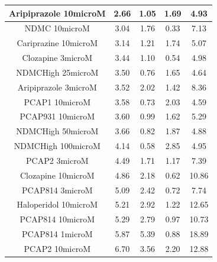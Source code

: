 \begin{table}[h!]
\begin{tabular}{|c|c|c|c|c|}
Aripiprazole 10microM & 2.66 & 1.05 & 1.69 & 4.93  \\ \hline
NDMC 10microM         & 3.04 & 1.76 & 0.33 & 7.13  \\ \hline
Cariprazine 10microM  & 3.14 & 1.21 & 1.74 & 5.07  \\ \hline
Clozapine 3microM     & 3.44 & 1.10  & 0.54 & 4.98  \\ \hline
NDMCHigh 25microM     & 3.50  & 0.76 & 1.65 & 4.64  \\ \hline
Aripiprazole 3microM  & 3.52 & 2.02 & 1.42 & 8.36  \\ \hline
PCAP1 10microM        & 3.58 & 0.73 & 2.03 & 4.59  \\ \hline
PCAP931 10microM      & 3.60  & 0.99 & 1.62 & 5.29  \\ \hline
NDMCHigh 50microM     & 3.66 & 0.82 & 1.87 & 4.88  \\ \hline
NDMCHigh 100microM    & 4.14 & 0.58 & 2.85 & 4.95  \\ \hline
PCAP2 3microM         & 4.49 & 1.71 & 1.17 & 7.39  \\ \hline
Clozapine 10microM    & 4.86 & 2.18 & 0.62 & 10.86 \\ \hline
PCAP814 3microM       & 5.09 & 2.42 & 0.72 & 7.74  \\ \hline
Haloperidol 10microM  & 5.21 & 2.92 & 1.22 & 12.65 \\ \hline
PCAP814 10microM      & 5.29 & 2.79 & 0.97 & 10.73 \\ \hline
PCAP814 1microM       & 5.87 & 5.39 & 0.88 & 18.89 \\ \hline
PCAP2 10microM        & 6.70  & 3.56 & 2.20  & 12.88 \\ \hline
\end{tabular}
\end{table}
\newpage
